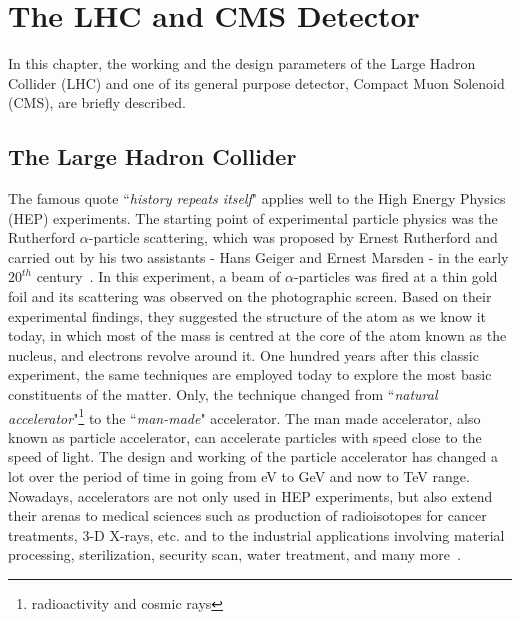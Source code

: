 \chapter{The LHC and CMS Detector} %
\label{cha:the_lhc_and_cms_machine}

In this chapter, the working and the design parameters of the Large Hadron Collider (LHC) and one of its general purpose detector, Compact Muon Solenoid (CMS), are briefly described.


\section{The Large Hadron Collider} %
\label{sec:the_large_hadron_collider}

The famous quote ``{\textit{history repeats itself}}" applies well to the High Energy Physics (HEP) experiments. 
The starting point of experimental particle physics was the Rutherford $\alpha$-particle scattering, which was proposed by Ernest Rutherford and carried out by his two assistants - Hans Geiger and Ernest Marsden - in the early $20^{th}$ century~\cite{Hauptman2010}. 
In this experiment, a beam of $\alpha$-particles was fired at a thin gold foil and its scattering was observed on the photographic screen. 
Based on their experimental findings, they suggested the structure of the atom as we know it today, in which most of the mass is centred at the core of the atom known as the nucleus, and electrons  revolve around it. 
One hundred years after this classic experiment, the same techniques are employed today to explore the most basic constituents of the matter. 
Only, the technique changed from ``{\textit{natural accelerator}}"\footnote{radioactivity and cosmic rays} to the ``{\textit{man-made}}" accelerator.
The man made accelerator, also known as particle accelerator, can accelerate particles with speed close to the speed of light. 
The design and working of the particle accelerator has changed a lot over the period of time in going from eV to GeV and now to TeV range. 
Nowadays, accelerators are not only used in HEP experiments, but also extend their arenas to medical sciences such as production of radioisotopes for cancer treatments, 3-D X-rays, etc. and to the industrial applications involving material processing, sterilization, security scan, water treatment, and many more~\cite{Demarteau2016}. 

